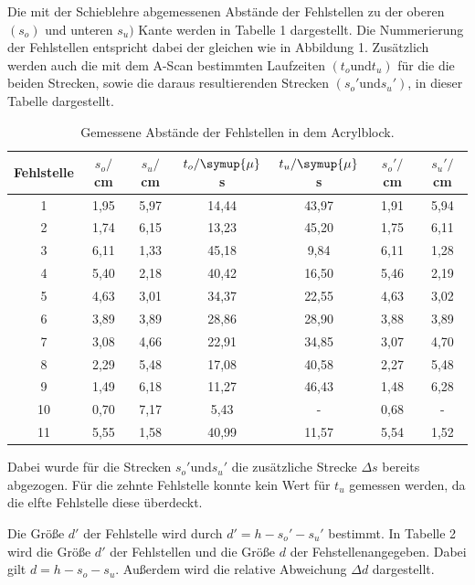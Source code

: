 Die mit der Schieblehre abgemessenen Abstände der Fehlstellen zu der oberen $(s_o)$ und unteren $s_u)$ Kante werden in Tabelle 1 dargestellt. Die Nummerierung der
Fehlstellen entspricht dabei der gleichen wie in Abbildung 1. Zusätzlich werden auch die mit dem A-Scan bestimmten Laufzeiten $(t_o \text{und} t_u)$ für die
die beiden Strecken, sowie die daraus resultierenden Strecken $(s_o' \text{und} s_u')$, in dieser Tabelle dargestellt.
\begin{table}[H]
  \centering
  \caption{Gemessene Abstände der Fehlstellen in dem Acrylblock.}
  \label{tab:spannung1}
  \begin{tabular}{c c c c c c c}
    \toprule
  Fehlstelle & $s_o/$cm & $s_u/$cm & $t_o/\symup{\mu}$s & $t_u/\symup{\mu}$s & $s_o'/$cm & $s_u'/$cm  \\
    \midrule
    1  &  1,95 & 5,97 & 14,44 & 43,97 & 1,91 & 5,94    \\
    2  &  1,74 & 6,15 & 13,23 & 45,20 & 1,75 & 6,11    \\
    3  &  6,11 & 1,33 & 45,18 & 9,84  & 6,11 & 1,28    \\
    4  &  5,40 & 2,18 & 40,42 & 16,50 & 5,46 & 2,19    \\
    5  &  4,63 & 3,01 & 34,37 & 22,55 & 4,63 & 3,02    \\
    6  &  3,89 & 3,89 & 28,86 & 28,90 & 3,88 & 3,89    \\
    7  &  3,08 & 4,66 & 22,91 & 34,85 & 3,07 & 4,70    \\
    8  &  2,29 & 5,48 & 17,08 & 40,58 & 2,27 & 5,48    \\
    9  &  1,49 & 6,18 & 11,27 & 46,43 & 1,48 & 6,28    \\
    10 &  0,70 & 7,17 & 5,43  & -     & 0,68 & -     \\
    11 &  5,55 & 1,58 & 40,99 & 11,57 & 5,54 & 1,52    \\
    \bottomrule
  \end{tabular}
\end{table}

Dabei wurde für die Strecken $s_o' \text{und} s_u'$ die zusätzliche Strecke $\Delta s$ bereits abgezogen. Für die zehnte Fehlstelle konnte
kein Wert für $t_u$ gemessen werden, da die elfte Fehlstelle diese überdeckt.

Die Größe $d'$ der Fehlstelle wird durch $d' = h - s_o' - s_u'$ bestimmt. In Tabelle 2 wird die Größe $d'$ der Fehlstellen und die
Größe $d$ der Fehstellenangegeben. Dabei gilt $d = h - s_o - s_u$. Außerdem wird die relative Abweichung $\Delta d$ dargestellt.

